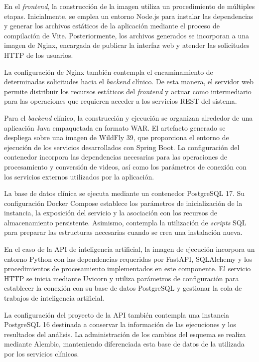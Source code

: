 En el \textit{frontend}, la construcción de la imagen utiliza un
procedimiento de múltiples etapas. Inicialmente, se emplea
un entorno Node.js para instalar las dependencias y generar
los archivos estáticos de la aplicación mediante el proceso
de compilación de Vite. Posteriormente, los archivos
generados se incorporan a una imagen de Nginx, encargada
de publicar la interfaz web y atender las solicitudes
HTTP de los usuarios.

La configuración de Nginx también contempla el
encaminamiento de determinadas solicitudes hacia el
\textit{backend} clínico. De esta manera, el servidor web
permite distribuir los recursos estáticos del \textit{frontend}
y actuar como intermediario para las operaciones que
requieren acceder a los servicios REST del sistema.

Para el \textit{backend} clínico, la construcción y ejecución
se organizan alrededor de una aplicación Java empaquetada
en formato WAR. El artefacto generado se despliega
sobre una imagen de WildFly 39, que proporciona el
entorno de ejecución de los servicios desarrollados
con Spring Boot. La configuración del contenedor
incorpora las dependencias necesarias para las
operaciones de procesamiento y conversión de videos,
así como los parámetros de conexión con los servicios
externos utilizados por la aplicación.

La base de datos clínica se ejecuta mediante un
contenedor PostgreSQL 17. Su configuración Docker
Compose establece los parámetros de inicialización
de la instancia, la exposición del servicio y la
asociación con los recursos de almacenamiento
persistente. Asimismo, contempla la utilización
de \textit{scripts} SQL para preparar las estructuras
necesarias cuando se crea una instalación nueva.

En el caso de la API de inteligencia artificial,
la imagen de ejecución incorpora un entorno Python
con las dependencias requeridas por FastAPI,
SQLAlchemy y los procedimientos de procesamiento
implementados en este componente. El servicio
HTTP se inicia mediante Uvicorn y utiliza
parámetros de configuración para establecer
la conexión con su base de datos PostgreSQL
y gestionar la cola de trabajos de inteligencia artificial.

La configuración del proyecto de la API también
contempla una instancia PostgreSQL 16 destinada
a conservar la información de las ejecuciones
y los resultados del análisis. La administración
de los cambios del esquema se realiza mediante
Alembic, manteniendo diferenciada esta base de
datos de la utilizada por los servicios clínicos.

